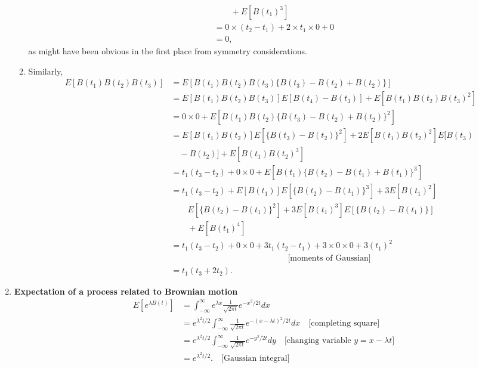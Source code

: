 \documentclass[11pt,a4paper]{article}
\begin{document}
\begin{enumerate}
\begin{enumerate}
\begin{align*}
        &  \qquad + E[B(t_1)^3]\\
        &= 0\times (t_2 - t_1) + 2\times t_1\times 0 + 0\\
        &= 0,
      \end{align*}
      as might have been obvious in the first place from symmetry considerations.
      \item Similarly,
      \begin{align*}
        E[B(t_1)B(t_2)B(t_3)]
        &= E[B(t_1)B(t_2)B(t_3)\{B(t_3) - B(t_2) + B(t_2)\}]\\
        &= E[B(t_1)B(t_2)B(t_3)]E[B(t_4) - B(t_3)] + E[B(t_1)B(t_2)B(t_3)^2]\\
        &= 0\times 0 + E[B(t_1)B(t_2)\{B(t_3) - B(t_2) + B(t_2)\}^2]\\
        &= E[B(t_1)B(t_2)]E[\{B(t_3) - B(t_2)\}^2] + 2E[B(t_1)B(t_2)^2]E[B(t_3) \\
        & \quad - B(t_2)] + E[B(t_1)B(t_2)^3]\\
        &= t_1(t_3 - t_2) + 0 \times 0 + E[B(t_1)\{B(t_2) - B(t_1) + B(t_1)\}^3]\\
        &= t_1(t_3 - t_2) + E[B(t_1)]E[\{B(t_2) - B(t_1)\}^3] + 3E[B(t_1)^2]\\
        & \qquad E[\{B(t_2) - B(t_1)\}^2] + 3E[B(t_1)^3]E[\{B(t_2) - B(t_1)\}] \\
        & \qquad + E[B(t_1)^4]\\
        &= t_1(t_3 - t_2) + 0 \times 0 + 3t_1(t_2 - t_1) + 3 \times 0 \times 0 + 3(t_1)^2\\
        & \qquad\qquad\qquad\qquad\qquad\qquad\qquad\text{[moments of Gaussian]}\\
        &= t_1(t_3 + 2t_2).
      \end{align*}
    \end{enumerate}
    \item \textbf{Expectation of a process related to Brownian motion}
    \begin{align*}
      E[e^{\lambda B(t)}]
      &= \int_{-\infty}^\infty e^{\lambda x}\frac{1}{\sqrt{2\pi t}}e^{-x^2/2t}dx\\
      &= e^{\lambda^2t/2}\int_{-\infty}^\infty\frac{1}{\sqrt{2\pi t}}e^{-(x - \lambda t)^2/2t}dx\quad\text{[completing square]}\\
      &= e^{\lambda^2t/2}\int_{-\infty}^\infty\frac{1}{\sqrt{2\pi t}}e^{-y^2/2t}dy\quad\text{[changing variable $y = x - \lambda t$]}\\
      &= e^{\lambda^2 t/2}.\quad\text{[Gaussian integral]}
    \end{align*}

\end{enumerate}
\end{document}
